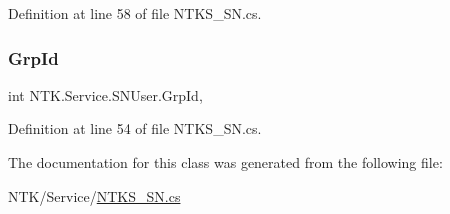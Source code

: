 Definition at line 58 of file N\+T\+K\+S\+\_\+\+S\+N.\+cs.

\mbox{\label{class_n_t_k_1_1_service_1_1_s_n_user_a55fb294d67c8861d7a8d72871f9e5eee}} 
\subsubsection{\texorpdfstring{GrpId}{GrpId}}
{\footnotesize\ttfamily int N\+T\+K.\+Service.\+S\+N\+User.\+Grp\+Id\hspace{0.3cm}{\ttfamily [get]}, {\ttfamily [set]}}







Definition at line 54 of file N\+T\+K\+S\+\_\+\+S\+N.\+cs.



The documentation for this class was generated from the following file\+:\begin{DoxyCompactItemize}
\item 
N\+T\+K/\+Service/\mbox{\hyperlink{_n_t_k_s___s_n_8cs}{N\+T\+K\+S\+\_\+\+S\+N.\+cs}}\end{DoxyCompactItemize}
